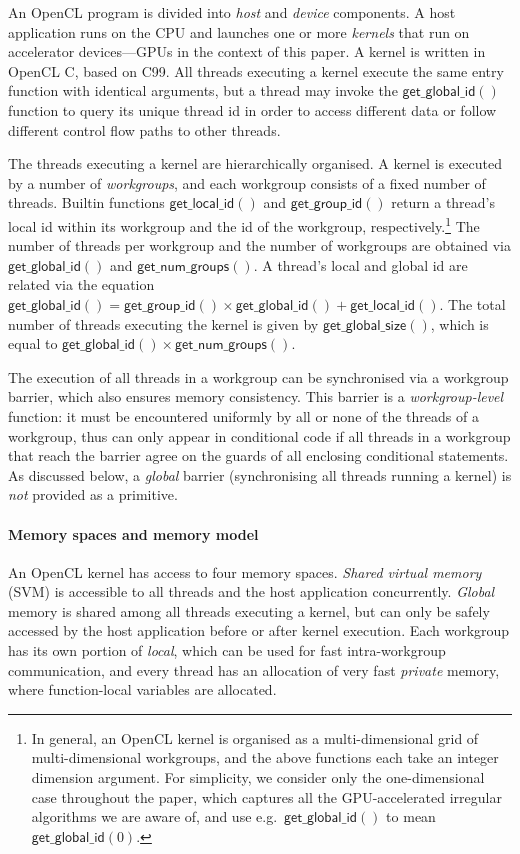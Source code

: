 \documentclass[numbers,nocopyrightspace,10pt]{sigplanconf}
\newcommand{\getgroupid}{\mathsf{get\_group\_id}}
\newcommand{\getnumgroups}{\mathsf{get\_num\_groups}}
\newcommand{\getlocalid}{\mathsf{get\_local\_id}}
\newcommand{\getglobalid}{\mathsf{get\_global\_id}}
\newcommand{\getlocalsize}{\mathsf{get\_global\_id}}
\newcommand{\getglobalsize}{\mathsf{get\_global\_size}}
\begin{document}
An OpenCL program is divided into \emph{host} and \emph{device}
components.  A host application runs on the CPU and launches one or
more \emph{kernels} that run on accelerator devices---GPUs in the
context of this paper.  A kernel is written in OpenCL C, based on C99.
All threads executing a kernel execute the same entry function with
identical arguments, but a thread may invoke the $\getglobalid()$
function to query its unique thread id in order to access different
data or follow different control flow paths to other threads.

The threads executing a kernel are hierarchically organised.  A kernel
is executed by a number of \emph{workgroups}, and each workgroup
consists of a fixed number of threads.  Builtin functions
$\getlocalid()$ and $\getgroupid()$ return a thread's local id within
its workgroup and the id of the workgroup, respectively.\footnote{In general, an OpenCL kernel is organised as a multi-dimensional grid
of multi-dimensional workgroups, and the above functions each take
an integer dimension argument.  For simplicity, we consider only the
one-dimensional case throughout the paper, which captures all the
GPU-accelerated irregular algorithms we are aware of, and use
e.g.\ $\getglobalid()$ to mean $\getglobalid(0)$.
}  The number
of threads per workgroup and the number of workgroups are obtained via
$\getlocalsize()$ and $\getnumgroups()$.  A thread's local and global
id are related via the equation $\getglobalid() = \getgroupid() \times
\getlocalsize() + \getlocalid()$.  The total number of threads executing the kernel is given by $\getglobalsize()$, which is equal to $\getlocalsize()\times\getnumgroups()$.

The execution of all threads in a workgroup can be synchronised via a
workgroup barrier, which also ensures memory consistency.  This
barrier is a \emph{workgroup-level} function: it must be encountered
uniformly by all or none of the threads of a workgroup, thus can only
appear in conditional code if all threads in a workgroup that reach
the barrier agree on the guards of all enclosing conditional
statements.  As discussed below, a \emph{global} barrier
(synchronising all threads running a kernel) is \emph{not} provided as
a primitive.

\paragraph{Memory spaces and memory model}
An OpenCL kernel has access to four memory spaces.  \emph{Shared virtual
memory} (SVM) is accessible to all threads and the host application concurrently.  \emph{Global} memory is shared among all threads executing a
kernel, but can only be safely accessed by the host application before
or after kernel execution.  Each workgroup has its own portion of \emph{local},
which can be used for fast intra-workgroup communication, and every thread has
an allocation of very fast \emph{private} memory, where
function-local variables are allocated.
\end{document}

